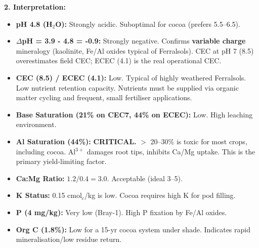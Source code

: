 \documentclass[11pt]{article}
\begin{document}
\begin{exoresolu}
\noindent\textbf{2. Interpretation:}
\begin{itemize}
\item \textbf{pH 4.8 (H$_2$O):} Strongly acidic. Suboptimal for cocoa (prefers 5.5--6.5).
\item \textbf{$\Delta$pH = 3.9 - 4.8 = -0.9:} Strongly negative. Confirms \textbf{variable charge} mineralogy (kaolinite, Fe/Al oxides typical of Ferralsols). CEC at pH 7 (8.5) overestimates field CEC; ECEC (4.1) is the real operational CEC.
\item \textbf{CEC (8.5) / ECEC (4.1):} Low. Typical of highly weathered Ferralsols. Low nutrient retention capacity. Nutrients must be supplied via organic matter cycling and frequent, small fertiliser applications.
\item \textbf{Base Saturation (21\% on CEC7, 44\% on ECEC):} Low. High leaching environment.
\item \textbf{Al Saturation (44\%):} \textbf{CRITICAL.} $>$ 20--30\% is toxic for most crops, including cocoa. Al$^{3+}$ damages root tips, inhibits Ca/Mg uptake. This is the primary yield-limiting factor.
\item \textbf{Ca:Mg Ratio:} $1.2 / 0.4 = 3.0$. Acceptable (ideal 3--5).
\item \textbf{K Status:} 0.15 cmol$_c$/kg is low. Cocoa requires high K for pod filling.
\item \textbf{P (4 mg/kg):} Very low (Bray-1). High P fixation by Fe/Al oxides.
\item \textbf{Org C (1.8\%):} Low for a 15-yr cocoa system under shade. Indicates rapid mineralisation/low residue return.
\end{itemize}


\end{exoresolu}
\end{document}
